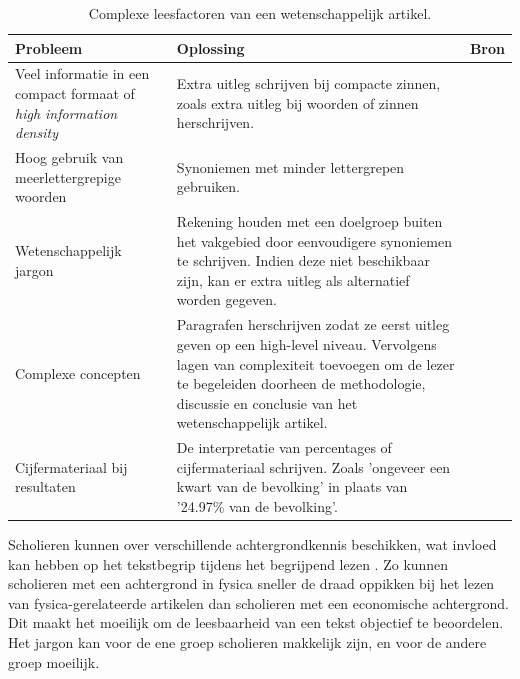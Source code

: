 \begin{center}
	\begin{table}[H]
	\begin{tabular}{| m{4cm} | m{8cm} | m{3cm} | }
		\hline
		\textbf{Probleem} & \textbf{Oplossing} & Bron \\
		\hline
		Veel informatie in een compact formaat of \textit{high information density} & Extra uitleg schrijven bij compacte zinnen, zoals extra uitleg bij woorden of zinnen herschrijven. & \autocite{Matarese2013, PlavenSigray2017} \\
		\hline
		Hoog gebruik van meerlettergrepige woorden & Synoniemen met minder lettergrepen gebruiken. & \autocite{Siddharthan2006} \\
		\hline
		Wetenschappelijk jargon & Rekening houden met een doelgroep buiten het vakgebied door eenvoudigere synoniemen te schrijven. Indien deze niet beschikbaar zijn, kan er extra uitleg als alternatief worden gegeven. & \autocite{PlavenSigray2017} \\
		\hline
		Complexe concepten & Paragrafen herschrijven zodat ze eerst uitleg geven op een high-level niveau. Vervolgens lagen van complexiteit toevoegen om de lezer te begeleiden doorheen de methodologie, discussie en conclusie van het wetenschappelijk artikel. & \autocite{Pain2016} \\ 
		\hline
		Cijfermateriaal bij resultaten & De interpretatie van percentages of cijfermateriaal schrijven. Zoals 'ongeveer een kwart van de bevolking' in plaats van '24.97\% van de bevolking'. & \autocite{PlavenSigray2017} \\
		\hline
	\end{tabular}
	\caption{Complexe leesfactoren van een wetenschappelijk artikel.}
	\label{table:scientific-paper-struggles}
	\end{table}
\end{center}

Scholieren kunnen over verschillende achtergrondkennis beschikken, wat invloed kan hebben op het tekstbegrip tijdens het begrijpend lezen \autocite{DeMeyer2019}. Zo kunnen scholieren met een achtergrond in fysica sneller de draad oppikken bij het lezen van fysica-gerelateerde artikelen dan scholieren met een economische achtergrond. Dit maakt het moeilijk om de leesbaarheid van een tekst objectief te beoordelen. Het jargon kan voor de ene groep scholieren makkelijk zijn, en voor de andere groep moeilijk.

\medspace

